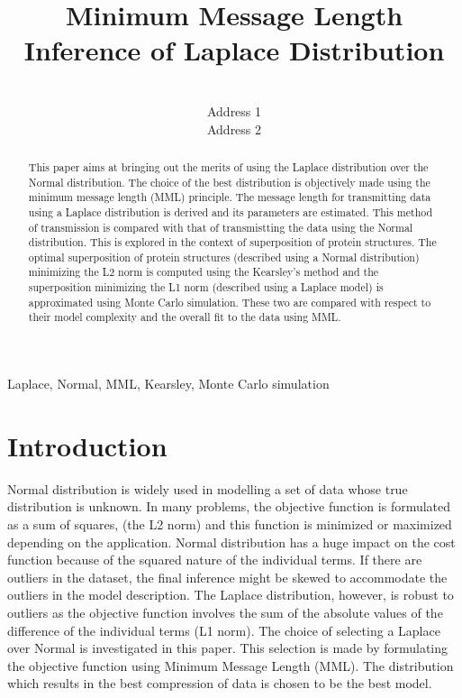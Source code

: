 \documentclass[wcp]{jmlr}
\title[MML Laplace]{Minimum Message Length Inference of Laplace Distribution}
\author{\Name{Author Name1} \Email{abc@sample.com}\\
  \addr Address 1
  \AND
  \Name{Author Name2} \Email{xyz@sample.com}\\
  \addr Address 2
 }
\begin{document}
\maketitle

\begin{abstract}
This paper aims at bringing out the merits of using the Laplace distribution over
the Normal distribution. The choice of the best distribution is objectively
made using the minimum message length (MML) principle. The message length for
transmitting data using a Laplace distribution is derived and its parameters are
estimated. This method of transmission is compared with that of transmistting the data
using the Normal distribution. This is explored in the context of superposition
of protein structures. The optimal superposition of protein structures (described
using a Normal distribution) minimizing the L2 norm is computed using the 
Kearsley's method and the superposition minimizing the
L1 norm (described using a Laplace model) is approximated using Monte Carlo 
simulation. These two are compared with respect
to their model complexity and the overall fit to the data using MML. 
\end{abstract}

\begin{keywords}
Laplace, Normal, MML, Kearsley, Monte Carlo simulation
\end{keywords}

\section{Introduction}
Normal distribution is widely used in modelling a set of data whose true distribution
is unknown. In many problems, the objective function is formulated as a sum of squares,
(the L2 norm) and this function is minimized or maximized depending on the application. 
Normal distribution has a huge impact on the cost function because of the squared nature of 
the individual terms. If there are outliers in the dataset, the final inference might be 
skewed to accommodate the outliers in the model description. The Laplace distribution, 
however, is robust to
outliers as the objective function involves the sum of the absolute values of the difference 
of the individual terms (L1 norm).
The choice of selecting a Laplace over Normal is investigated in this paper. This
selection is made by formulating the objective function using Minimum Message
Length (MML). The distribution which results in the best compression of data is chosen
to be the best model. \\
\end{document}

